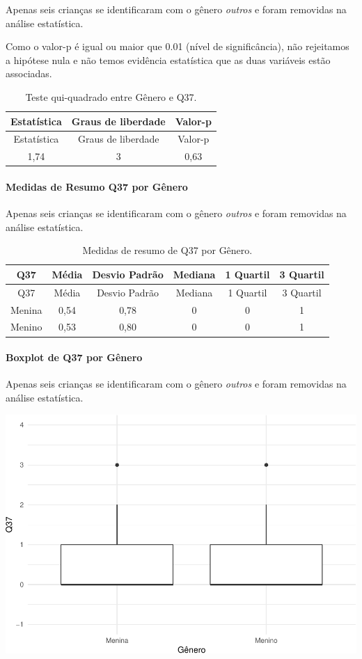 \documentclass[]{article}
\let\oldparagraph\paragraph
\renewcommand{\paragraph}[1]{\oldparagraph{#1}\mbox{}}
\begin{document}
Apenas seis crianças se identificaram com o gênero \emph{outros} e foram removidas na análise estatística.

Como o valor-p é igual ou maior que 0.01 (nível de significância), não rejeitamos a hipótese nula e não temos evidência estatística que as duas variáveis estão associadas.

\begin{longtable}[]{@{}ccc@{}}
\caption{\label{tab:unnamed-chunk-1382}Teste qui-quadrado entre Gênero e Q37.}\tabularnewline
\toprule
Estatística & Graus de liberdade & Valor-p\tabularnewline
\midrule
\endfirsthead
\toprule
Estatística & Graus de liberdade & Valor-p\tabularnewline
\midrule
\endhead
1,74 & 3 & 0,63\tabularnewline
\bottomrule
\end{longtable}

\cleardoublepage

\hypertarget{medidas-de-resumo-q37-por-guxeanero}{%
\paragraph{Medidas de Resumo Q37 por Gênero}\label{medidas-de-resumo-q37-por-guxeanero}}

Apenas seis crianças se identificaram com o gênero \emph{outros} e foram removidas na análise estatística.

\begin{longtable}[]{@{}cccccc@{}}
\caption{\label{tab:unnamed-chunk-1383}Medidas de resumo de Q37 por Gênero.}\tabularnewline
\toprule
Q37 & Média & Desvio Padrão & Mediana & 1 Quartil & 3 Quartil\tabularnewline
\midrule
\endfirsthead
\toprule
Q37 & Média & Desvio Padrão & Mediana & 1 Quartil & 3 Quartil\tabularnewline
\midrule
\endhead
Menina & 0,54 & 0,78 & 0 & 0 & 1\tabularnewline
Menino & 0,53 & 0,80 & 0 & 0 & 1\tabularnewline
\bottomrule
\end{longtable}

\hypertarget{boxplot-de-q37-por-guxeanero}{%
\paragraph{Boxplot de Q37 por Gênero}\label{boxplot-de-q37-por-guxeanero}}

Apenas seis crianças se identificaram com o gênero \emph{outros} e foram removidas na análise estatística.

\begin{center}\includegraphics[width=0.75\linewidth]{relatorio_covid19_files/figure-latex/unnamed-chunk-1384-1} \end{center}
\end{document}
